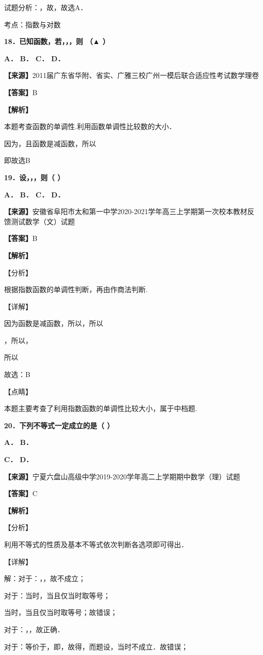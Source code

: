\documentclass[
]{article}
\begin{document}
试题分析：，故，故选A．

考点：指数与对数

\textbf{18．已知函数，若，，，则 （▲ ）}

\textbf{A． B． C． D．}

\textbf{【来源】}2011届广东省华附、省实、广雅三校广州一模后联合适应性考试数学理卷

\textbf{【答案】}B

\textbf{【解析】}

本题考查函数的单调性.利用函数单调性比较数的大小．

因为，且函数是减函数，所以

即故选B

\textbf{19．设，，，则（ ）}

\textbf{A． B． C． D．}

\textbf{【来源】}安徽省阜阳市太和第一中学2020-2021学年高三上学期第一次校本教材反馈测试数学（文）试题

\textbf{【答案】}B

\textbf{【解析】}

【分析】

根据指数函数的单调性判断，再由作商法判断.

【详解】

因为函数是减函数，所以，所以

，所以，

所以

故选：B

【点睛】

本题主要考查了利用指数函数的单调性比较大小，属于中档题.

\textbf{20．下列不等式一定成立的是（ ）}

\textbf{A． B．}

\textbf{C． D．}

\textbf{【来源】}宁夏六盘山高级中学2019-2020学年高二上学期期中数学（理）试题

\textbf{【答案】}C

\textbf{【解析】}

【分析】

利用不等式的性质及基本不等式依次判断各选项即可得出．

【详解】

解：对于：，，故不成立；

对于：当时，当且仅当时取等号；

当时，当且仅当时取等号；故错误；

对于：，，故正确．

对于：等价于，即，故得，而题设，当时不成立．故错误；
\end{document}
